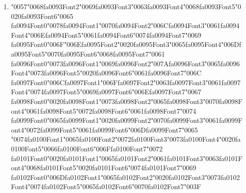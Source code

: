\documentclass[12pt]{article}
\begin{document}
\begin{enumerate}[label=Q\arabic*.]
 \item {\char"0057}{\char"0068}{\csname fa0093Font2\endcsname\char"0069}{\csname fa0093Font3\endcsname\char"0063}{\csname fa0093Font4\endcsname\char"0068}{\csname fa0093Font5\endcsname\char"0020}{\csname fa0093Font6\endcsname\char"0065} {\csname fa0094Font0\endcsname\char"0078}{\csname fa0094Font1\endcsname\char"0070}{\csname fa0094Font2\endcsname\char"006C}{\csname fa0094Font3\endcsname\char"0061}{\csname fa0094Font4\endcsname\char"006E}{\csname fa0094Font5\endcsname\char"0061}{\csname fa0094Font6\endcsname\char"0074}{\csname fa0094Font7\endcsname\char"0069} {\csname fa0095Font0\endcsname\char"006F}{\char"006E}{\csname fa0095Font2\endcsname\char"0020}{\csname fa0095Font3\endcsname\char"0065}{\csname fa0095Font4\endcsname\char"006D}{\csname fa0095Font5\endcsname\char"0070}{\csname fa0095Font6\endcsname\char"0068}{\csname fa0095Font7\endcsname\char"0061} {\csname fa0096Font0\endcsname\char"0073}{\csname fa0096Font1\endcsname\char"0069}{\csname fa0096Font2\endcsname\char"007A}{\csname fa0096Font3\endcsname\char"0065}{\csname fa0096Font4\endcsname\char"0073}{\csname fa0096Font5\endcsname\char"0020}{\csname fa0096Font6\endcsname\char"0061}{\csname fa0096Font7\endcsname\char"006C} {\csname fa0097Font0\endcsname\char"006C}{\csname fa0097Font1\endcsname\char"006F}{\csname fa0097Font2\endcsname\char"0063}{\csname fa0097Font3\endcsname\char"0061}{\csname fa0097Font4\endcsname\char"0074}{\csname fa0097Font5\endcsname\char"0069}{\csname fa0097Font6\endcsname\char"006E}{\csname fa0097Font7\endcsname\char"0067} {\csname fa0098Font0\endcsname\char"0020}{\csname fa0098Font1\endcsname\char"0073}{\csname fa0098Font2\endcsname\char"0065}{\csname fa0098Font3\endcsname\char"0070}{\csname fa0098Font4\endcsname\char"0061}{\csname fa0098Font5\endcsname\char"0072}{\csname fa0098Font6\endcsname\char"0061}{\csname fa0098Font7\endcsname\char"0074} {\csname fa0099Font0\endcsname\char"0065}{\csname fa0099Font1\endcsname\char"0020}{\csname fa0099Font2\endcsname\char"0070}{\csname fa0099Font3\endcsname\char"0061}{\csname fa0099Font4\endcsname\char"0072}{\csname fa0099Font5\endcsname\char"0061}{\csname fa0099Font6\endcsname\char"006D}{\csname fa0099Font7\endcsname\char"0065} {\char"0074}{\csname fa0100Font1\endcsname\char"0065}{\csname fa0100Font2\endcsname\char"0072}{\csname fa0100Font3\endcsname\char"0073}{\csname fa0100Font4\endcsname\char"0020}{\csname fa0100Font5\endcsname\char"0066}{\csname fa0100Font6\endcsname\char"006F}{\csname fa0100Font7\endcsname\char"0072} {\csname fa0101Font0\endcsname\char"0020}{\csname fa0101Font1\endcsname\char"0065}{\csname fa0101Font2\endcsname\char"0061}{\csname fa0101Font3\endcsname\char"0063}{\csname fa0101Font4\endcsname\char"0068}{\csname fa0101Font5\endcsname\char"0020}{\csname fa0101Font6\endcsname\char"0074}{\csname fa0101Font7\endcsname\char"0069} {\csname fa0102Font0\endcsname\char"006D}{\csname fa0102Font1\endcsname\char"0065}{\csname fa0102Font2\endcsname\char"0020}{\csname fa0102Font3\endcsname\char"0073}{\csname fa0102Font4\endcsname\char"0074}{\csname fa0102Font5\endcsname\char"0065}{\csname fa0102Font6\endcsname\char"0070}{\csname fa0102Font7\endcsname\char"003F}

\end{enumerate}
\end{document}
